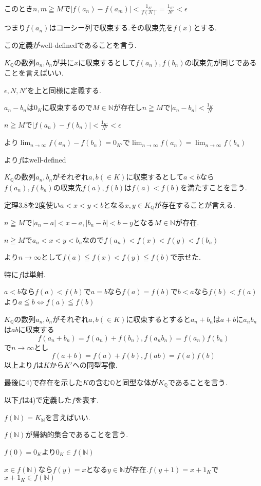 \documentclass{jsarticle}
\begin{document}
このとき$n,m\geqq M$で$|f(a_n)-f(a_m)|<\frac{1_{K'}}{f(N)}=\frac{1_{K'}}{N'}<\epsilon$

つまり$f(a_n)$はコーシー列で収束する.その収束先を$f(x)$とする.

この定義がwell-definedであることを言う.

$K_{\mathbb{Q}}$の数列$a_n,b_n$が共に$x$に収束するとして$f(a_n),f(b_n)$の収束先が同じであることを言えばいい.

$\epsilon ,N,N'$を上と同様に定義する.

$a_n-b_n$は$0_{K}$に収束するので$M\in\mathbb{N}$が存在し$n\geqq M$で$|a_n-b_n|<\frac{1_K}{N}$

$n\geqq M$で$|f(a_n)-f(b_n)|<\frac{1_{K'}}{N'}<\epsilon$

より$\displaystyle \lim_{n\to\infty}f(a_n)-f(b_n)=0_{K'}$で$\displaystyle \lim_{n\to\infty}f(a_n)=\displaystyle \lim_{n\to\infty}f(b_n)$

より$f$はwell-defined

$K_{\mathbb{Q}}$の数列$a_n,b_n$がそれぞれ$a,b(\in K)$に収束するとして$a<b$なら$f(a_n),f(b_n)$の収束先$f(a),f(b)$は$f(a)<f(b)$を満たすことを言う.

定理3.8を2度使い$a<x<y<b$となる$x,y\in K_{\mathbb{Q}}$が存在することが言える.

$n\geqq M$で$|a_n-a|<x-a,|b_n-b|<b-y$となる$M\in\mathbb{N}$が存在.

$n\geqq M$で$a_n<x<y<b_n$なので$f(a_n)<f(x)<f(y)<f(b_n)$

より$n\to\infty$として$f(a)\leqq f(x)<f(y) \leqq f(b)$で示せた.

特に$f$は単射.

$a<b$なら$f(a)<f(b)$で$a=b$なら$f(a)=f(b)$で$b<a$なら$f(b)<f(a)$より$a\leqq b\Leftrightarrow f(a)\leqq f(b)$

$K_{\mathbb{Q}}$の数列$a_n,b_n$がそれぞれ$a,b(\in K)$に収束するとすると$a_n+b_n$は$a+b$に$a_nb_n$は$ab$に収束する
\[f(a_n+b_n)=f(a_n)+f(b_n),f(a_nb_n)=f(a_n)f(b_n)\]
で$n\to\infty$とし
\[f(a+b)=f(a)+f(b),f(ab)=f(a)f(b)\]
以上より$f$は$K$から$K'$への同型写像.

最後に4)で存在を示した$K$の含む$\mathbb{Q}$と同型な体が$K_{\mathbb{Q}}$であることを言う.

以下$f$は4)で定義した$f$を表す.

$f(\mathbb{N}) = K_{\mathbb{N}}$を言えばいい.

$f(\mathbb{N})$が帰納的集合であることを言う.

$f(0)=0_K$より$0_K\in f(\mathbb{N})$

$x\in f(\mathbb{N})$なら$f(y) = x$となる$y\in\mathbb{N}$が存在.$f(y+1)=x+1_K$で$x+1_K\in f(\mathbb{N})$
\end{document}
